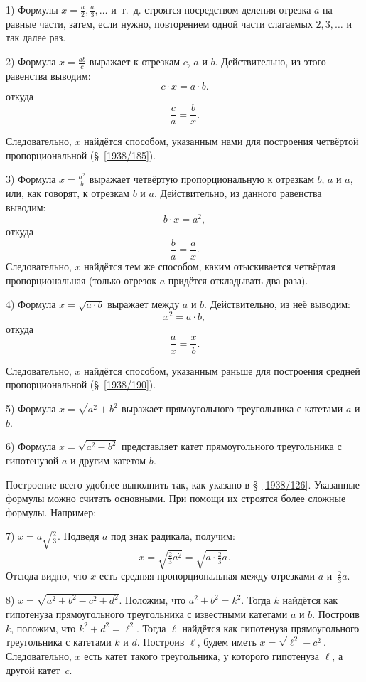 \documentclass[twoside]{book}
\begin{document}
1) Формулы $x=\frac a2, \frac a3,\dots$ и~т.~д. строятся посредством деления отрезка $a$ на равные части, затем, если нужно, повторением одной части слагаемых $2, 3,\dots$ и так далее раз.

2) Формула $x=\frac{ab}c$ выражает  к отрезкам $c$, $a$ и $b$.
Действительно, из этого равенства выводим:
\[c\cdot x=a\cdot b.\]
откуда
\[\frac ca=\frac bx.\]

Следовательно, $x$ найдётся способом, указанным нами для построения четвёртой пропорциональной (§~\ref{1938/185}).

3) Формула $x=\frac{a^2}b$ выражает четвёртую пропорциональную к отрезкам $b$, $a$ и $a$, или, как говорят,  к отрезкам $b$ и $a$.
Действительно, из данного равенства выводим:
\[b\cdot x=a^2,\]
откуда
\[\frac ba=\frac ax.\]
Следовательно, $x$ найдётся тем же способом, каким отыскивается четвёртая пропорциональная (только отрезок $a$ придётся откладывать два раза).

4) Формула $x=\sqrt{a\cdot b}$ выражает  между $a$ и $b$.
Действительно, из неё выводим:
\[x^2=a\cdot b,\]
откуда
\[\frac ax=\frac xb.\]

Следовательно, $x$ найдётся способом, указанным раньше для построения средней пропорциональной (§~\ref{1938/190}).

5) Формула $x=\sqrt{a^2+b^2}$ выражает  прямоугольного треугольника с катетами $a$ и $b$.


6) Формула $x=\sqrt{a^2-b^2}$ представляет катет прямоугольного треугольника с гипотенузой $a$ и другим катетом $b$.

Построение всего удобнее выполнить так, как указано в §~\ref{1938/126}.
Указанные формулы можно считать основными.
При помощи их строятся более сложные формулы.
Например:

7) $x=a\sqrt{\frac23}$.
Подведя $a$ под знак радикала, получим:
\[x=\sqrt{\tfrac23a^2}=\sqrt{a\cdot\tfrac23a}.\]
Отсюда видно, что $x$ есть средняя пропорциональная между отрезками $a$ и~$\tfrac23a$.

8) $x=\sqrt{a^2 + b^2 - c^2 + d^2}$.
Положим, что  $a^2+b^2=k^2$.
Тогда $k$ найдётся как гипотенуза прямоугольного треугольника с известными катетами $a$ и $b$.
Построив $k$, положим, что $k^2+d^2=\ell^2$.
Тогда $\ell$ найдётся как гипотенуза прямоугольного треугольника с катетами $k$ и $d$.
Построив $\ell$, будем иметь $x=\sqrt{\ell^2-c^2}$.
Следовательно, $x$ есть катет такого треугольника, у которого гипотенуза $\ell$, а другой катет~$c$.
\end{document}

